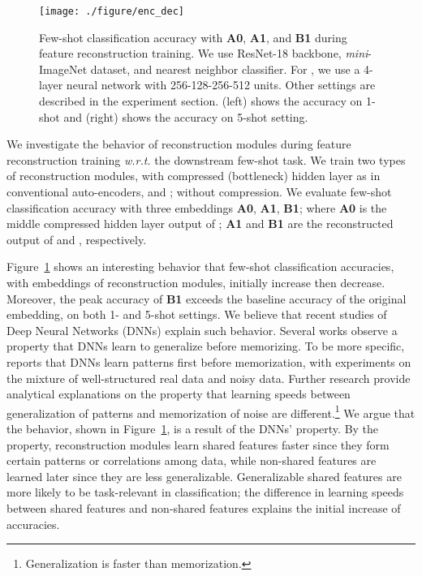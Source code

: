 \documentclass{article}
\begin{document}
\begin{figure}[t]
	\vskip -0.1in
	\begin{center}
		\centerline{\texttt{[image: ./figure/enc\_dec]}}
		\vskip -0.15in
		\caption{
			Few-shot classification accuracy with \textbf{A0}, \textbf{A1}, and \textbf{B1} during feature reconstruction training. 
			We use ResNet-18 backbone, \textit{mini}-ImageNet dataset, and nearest neighbor classifier.
			For , we use a 4-layer neural network with 256-128-256-512 units.
			Other settings are described in the experiment section.
			(left) shows the accuracy on 1-shot and (right) shows the accuracy on 5-shot setting.}
		\label{graph:training_dynamics}
	\end{center}
	\vskip -0.4in
\end{figure}
We investigate the behavior of reconstruction modules during feature reconstruction training \textit{w.r.t.} the downstream few-shot task. We train two types of reconstruction modules,  with compressed (bottleneck) hidden layer as in conventional auto-encoders, and ; without compression. We evaluate few-shot classification accuracy with three embeddings \textbf{A0}, \textbf{A1}, \textbf{B1}; where \textbf{A0} is the middle compressed hidden layer output of ; \textbf{A1} and \textbf{B1} are the reconstructed output of  and , respectively.

Figure~\ref{graph:training_dynamics} shows an interesting behavior that few-shot classification accuracies, with embeddings of reconstruction modules, initially increase then decrease. Moreover, the peak accuracy of \textbf{B1} exceeds the baseline accuracy of the original embedding, on both 1- and 5-shot settings. 
We believe that recent studies of Deep Neural Networks (DNNs) explain such behavior. Several works \cite{ArpitL17, Lampinen19, stephenson21} observe a property that DNNs learn to generalize before memorizing. To be more specific, \citet{ArpitL17} reports that DNNs learn patterns first before memorization, with experiments on the mixture of well-structured real data and noisy data. Further research \citet{Lampinen19, stephenson21} provide analytical explanations on the property that learning speeds between generalization of patterns and memorization of noise are different.\footnote{Generalization is faster than memorization.} We argue that the behavior, shown in Figure~\ref{graph:training_dynamics}, is a result of the DNNs' property. By the property, reconstruction modules learn shared features faster since they form certain patterns or correlations among data, while non-shared features are learned later since they are less generalizable. Generalizable shared features are more likely to be task-relevant in classification; the difference in learning speeds between shared features and non-shared features explains the initial increase of accuracies.
\end{document}
